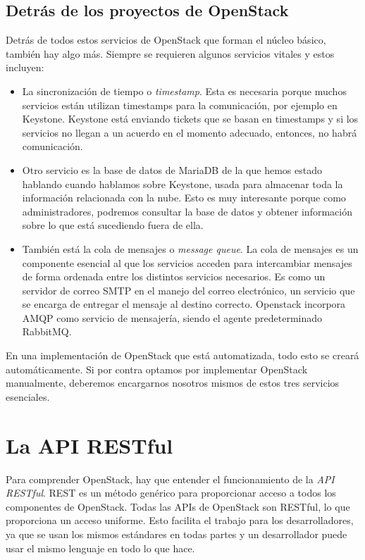 \subsection{Detrás de los proyectos de OpenStack}
Detrás de todos estos servicios de OpenStack que forman el núcleo básico, también hay algo más. Siempre se requieren algunos servicios vitales y estos incluyen:

\begin{itemize}
\item La sincronización de tiempo o \textit{timestamp}. Esta es necesaria porque muchos servicios están utilizan timestamps para la comunicación, por ejemplo en Keystone. Keystone está enviando tickets que se basan en timestamps y si los servicios no llegan a un acuerdo en el momento adecuado, entonces, no habrá comunicación.
\item Otro servicio es la base de datos de MariaDB de la que hemos estado hablando cuando hablamos sobre Keystone, usada para almacenar toda la información relacionada con la nube. Esto es muy interesante porque como administradores, podremos consultar la base de datos y obtener información sobre lo que está sucediendo fuera de ella.
\item También está la cola de mensajes o \textit{message queue}. La cola de mensajes es un componente esencial al que los servicios acceden para intercambiar mensajes de forma ordenada entre los distintos servicios necesarios. Es como un servidor de correo SMTP en el manejo del correo electrónico, un servicio que se encarga de entregar el mensaje al destino correcto. Openstack incorpora AMQP como servicio de mensajería, siendo el agente predeterminado RabbitMQ.
\end{itemize}

En una implementación de OpenStack que está automatizada, todo esto se creará automáticamente. Si por contra optamos por implementar OpenStack manualmente, deberemos encargarnos nosotros mismos de estos tres servicios esenciales.

\section{La API RESTful}

Para comprender OpenStack, hay que entender el funcionamiento de la \textit{API RESTful}. REST es un método genérico para proporcionar acceso a todos los componentes de OpenStack. Todas las APIs de OpenStack son RESTful, lo que proporciona un acceso uniforme. Esto facilita el trabajo para los desarrolladores, ya que se usan los mismos estándares en todas partes y un desarrollador puede usar el mismo lenguaje en todo lo que hace.

